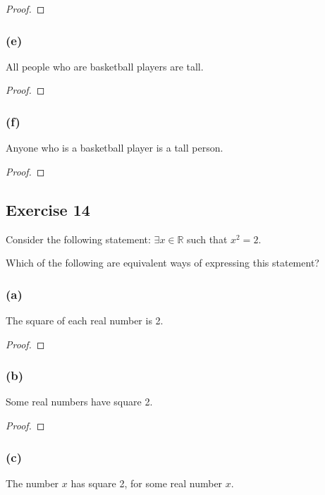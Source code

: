 \documentclass[14pt]{extarticle}
\newcommand{\R}{\mathbb{R}}
\newcommand{\te}{\exists}
\begin{document}
\begin{proof}

\end{proof}

\subsubsection{(e)}
All people who are basketball players are tall.

\begin{proof}

\end{proof}

\subsubsection{(f)}
Anyone who is a basketball player is a tall person.

\begin{proof}

\end{proof}

\subsection{Exercise 14}
Consider the following statement: $\te x \in \R$ such that $x^2 = 2$.

Which of the following are equivalent ways of expressing this statement?

\subsubsection{(a)}
The square of each real number is 2.

\begin{proof}

\end{proof}

\subsubsection{(b)}
Some real numbers have square 2.

\begin{proof}

\end{proof}

\subsubsection{(c)}
The number $x$ has square 2, for some real number $x$.
\end{document}
